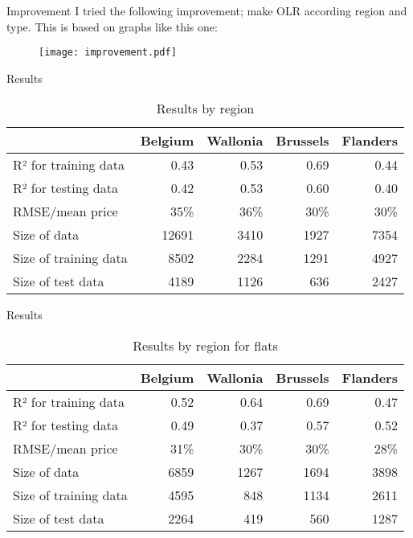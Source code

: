 \documentclass[handout,10pt,hyperref={urlcolor=orange}]{beamer}
\begin{document}
\begin{frame}{Improvement}
  I tried the following improvement; make OLR according region and type. This is based on graphs like this one:
  \begin{figure}[h]
    \centering
    \texttt{[image: improvement.pdf]}
  \end{figure}
\end{frame}
\begin{frame}{Results}
  \begin{table}
    \centering
    \begin{tabular}{lrrrr}
      \toprule
      {} &        Belgium &      Wallonia &      Brussels &      Flanders \\
      \midrule
      R²  for training data  &           0.43 &          0.53 &          0.69 &          0.44 \\
      R² for testing data   &           0.42 &          0.53 &          0.60 &          0.40 \\
      RMSE/mean price  & 35\% & 36\% & 30\% &30\% \\
      Size of data          &       12691 &       3410 &       1927&       7354 \\
      Size of training data &        8502 &       2284 &       1291 &       4927 \\
      Size of test data     &        4189 &       1126 &        636 &       2427 \\
      \bottomrule
    \end{tabular}
    \caption{Results by region}
  \end{table}
\end{frame}
\begin{frame}{Results}
    \begin{table}
    \centering
      \begin{tabular}{lrrrr}
\toprule
{} &       Belgium &      Wallonia &      Brussels &      Flanders \\
\midrule
R² for training data  &          0.52 &          0.64 &          0.69 &          0.47 \\
R² for testing data   &          0.49 &          0.37 &          0.57 &          0.52 \\
RMSE/mean price  & 31\% & 30\% & 30\% & 28\% \\
Size of data          &       6859 &       1267 &       1694 &       3898 \\
Size of training data &       4595 &        848 &       1134 &       2611 \\
Size of test data     &       2264 &        419 &        560 &       1287 \\
\bottomrule
\end{tabular}
    \caption{Results by region for flats}
  \end{table}


\end{frame}
\end{document}
